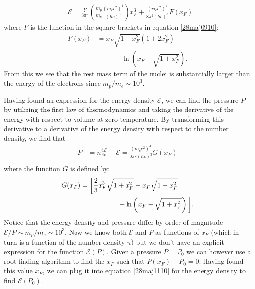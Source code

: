 \documentclass[twocolumn]{article}
\begin{document}
\begin{large}
\begin{equation}
    \label{28maj1110}
    \begin{split}
        &\mathcal{E}=\frac{Y}{3\pi^2}\left(\frac{m_p}{m_e}\frac{(m_ec^2)^4}{(\hbar c)^3}\right)x_F^3 + \frac{(m_ec^2)^4}{8\pi^2(\hbar c)^3}F(x_F)
    \end{split}
\end{equation}
where $F$ is the function in the square brackets in equation \eqref{28maj0910}:
\begin{equation}
    \label{28maj1448}
    \begin{split}
        F(x_F) &= x_F\sqrt{1+x_F^2}\left(1+2x_F^2\right) \\ 
        &\hspace{1cm}-\ln\left(x_F+\sqrt{1+x_F^2}\right).
    \end{split}
\end{equation}
From this we see that the rest mass term of the nuclei is substantially larger than the energy of the electrons since $m_p/m_e\sim 10^3$. 

Having found an expression for the energy density $\mathcal{E}$, we can find the pressure $P$ by utilizing the first law of thermodynamics and taking the derivative of the energy with respect to volume at zero temperature. By transforming this derivative to a derivative of the energy density with respect to the number density, we find that
\begin{equation}
    \label{28maj1025}
    \begin{split}
        P &= n\frac{\text{d}\mathcal{E}}{\text{d}n} - \mathcal{E} = \frac{(m_ec^2)^4}{8\pi^2(\hbar c)^3}G(x_F)\\ 
    \end{split}
\end{equation}
where the function $G$ is defined by:
\begin{equation}
    \label{28maj1450}
    \begin{split}
        &G(x_F) = \bigg[\frac{2}{3}x_F^3\sqrt{1+x_F^2}-x_F\sqrt{1+x_F^2} \\ 
        &\hspace{2.90cm}+\ln\left(x_F+\sqrt{1+x_F^2}\right)\bigg]. 
    \end{split}
\end{equation}
Notice that the energy density and pressure differ by order of magnitude $\mathcal{E}/P\sim m_p/m_e\sim 10^3$. Now we know both $\mathcal{E}$ and $P$ as functions of $x_F$ (which in turn is a function of the number density $n$) but we don't have an explicit expression for the function $\mathcal{E}(P)$. Given a pressure $P=P_0$ we can however use a root finding algorithm to find the $x_F$ such that $P(x_F) - P_0 = 0$. Having found this value $x_F$, we can plug it into equation \eqref{28maj1110} for the energy density to find $\mathcal{E}(P_0)$. 


\end{large}
\end{document}
